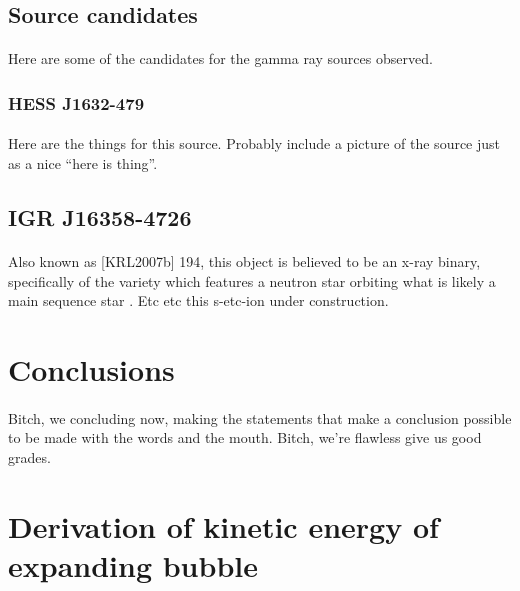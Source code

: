 \documentclass[a4paper, titlepage, oneside]{article}
\begin{document}
\begin{multicols}{2}
\subsection{Source candidates}
\paragraph{}
Here are some of the candidates for the gamma ray sources observed.

\subsubsection{HESS J1632-479}
\paragraph{}
Here are the things for this source. Probably include a picture of the source just as a nice ``here is thing''.

\subsection{IGR J16358-4726}
\paragraph{}
Also known as [KRL2007b] 194, this object is believed to be an x-ray binary, specifically of the variety which features a neutron star orbiting what is likely a main sequence star \parencite{Falanga:2011}. Etc etc this s-etc-ion under construction.

\section{Conclusions}
\paragraph{}
Bitch, we concluding now, making the statements that make a conclusion possible to be made with the words and the mouth. Bitch, we're flawless give us good grades.
\end{multicols}

\newpage

\appendix

\section{Derivation of kinetic energy of expanding bubble}
\label{app:kinetic}
\end{document}
